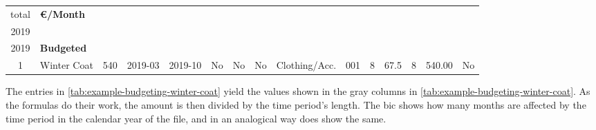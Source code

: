 \begin{table}[hbtp]
\begin{tabular}{|c|l|l|l|l|c|c|c|r|c|r|c|r|r|c|}
\begin{minipage}[b][0.8cm]{1cm}
			total
		\end{minipage} &
		\footnotesize\bfseries €/Month &
		\begin{minipage}[b]{1.2cm}\footnotesize\bfseries
			Months in\\
			2019
		\end{minipage} &
		\begin{minipage}[b]{0.6cm}\footnotesize\bfseries
			€ in\\
			2019
		\end{minipage} &
		\footnotesize\bfseries Budgeted\\ 
		\hline
		\hline
		1 & Winter Coat & 540 & 2019-03 & 2019-10 & No & No & No & Clothing/Acc. & \cellcolor{lightgray}001 & \cellcolor{lightgray}8 & \cellcolor{lightgray}67.5 & \cellcolor{lightgray}8 & \cellcolor{lightgray}540.00 & \cellcolor{lightgray}No\\
		\hline
	\end{tabular}
\end{table}

The entries in \autoref{tab:example-budgeting-winter-coat} yield the values shown in the gray columns in \autoref{tab:example-budgeting-winter-coat}.
As the formulas do their work, the amount is then divided by the time period's length.
The \ac{bic}  shows how many months are affected by the time period in the calendar year of the file, and in an analogical way does  show the same.


